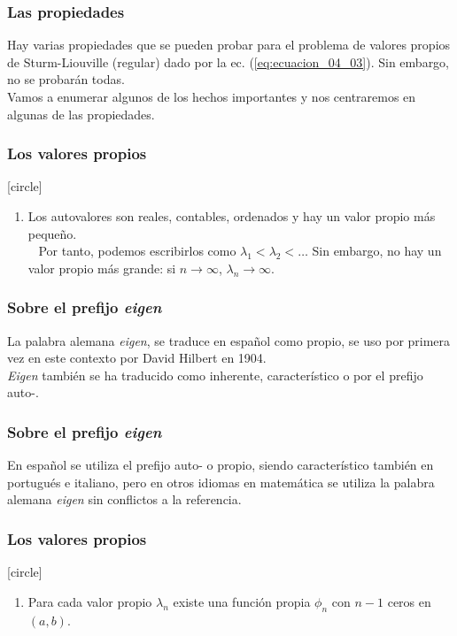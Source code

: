 \documentclass[12pt]{beamer}
\begin{document}
\begin{frame}
\frametitle{Las propiedades}
Hay varias propiedades que se pueden probar para el problema de valores propios de Sturm-Liouville (regular) dado por la ec. (\ref{eq:ecuacion_04_03}). Sin embargo, no se probarán todas.
\\
\bigskip
\pause
Vamos a enumerar algunos de los hechos importantes y nos centraremos en algunas de las propiedades.
\end{frame}
\begin{frame}
\frametitle{Los valores propios}
[circle]
\begin{enumerate}[<+->]
\item Los autovalores son reales, contables, ordenados y hay un valor propio más pequeño.
\\\
\bigskip
\pause
Por tanto, podemos escribirlos como $\lambda_{1} < \lambda_{2} < \ldots $ Sin embargo, no hay un valor propio más grande: si $n \to \infty$, $\lambda_{n} \to \infty$.
\seti
\end{enumerate}
\end{frame}
\begin{frame}
\frametitle{Sobre el prefijo \emph{eigen}}
La palabra alemana \emph{eigen}, se traduce en español como propio, se uso por primera vez en este contexto por David Hilbert en 1904.
\\
\bigskip
\pause
\emph{Eigen} también se ha traducido como inherente, característico o por el prefijo auto-. 
\end{frame}
\begin{frame}
\frametitle{Sobre el prefijo \emph{eigen}}
En español se utiliza el prefijo auto- o propio, siendo característico también en portugués e italiano, pero en otros idiomas en matemática se utiliza la palabra alemana \emph{eigen} sin conflictos a la referencia.
\end{frame}
\begin{frame}
\frametitle{Los valores propios}
[circle]
\begin{enumerate}[<+->]
\conti
\item Para cada valor propio $\lambda_{n}$ existe una función propia $\phi_{n}$ con $n - 1$ ceros en $(a, b)$.
\seti
\end{enumerate}
\end{frame}
\end{document}
